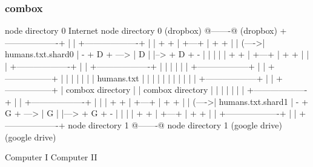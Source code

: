 \begin{frame}[fragile]
  \frametitle{combox}

  {\tiny
  \begin{semiverbatim}

         node directory 0                Internet              node directory 0
         (dropbox)                       @-------@             (dropbox)
        +-------------------+            |       |            +-------------------+
        |                   |    + +     | +---+ |     + +    |                   |
  (---->| humans.txt.shard0 | - + D + ---> | D | |--> + D + - |                   |
  |     |                   |    + +     | +---+ |     + +    |                   |
  |     +-------------------+            |       |            +-------------------+
  |                                      |       |
  |                                      |       |
 +------------------+                    |       |                        +-----------------+
 |                  |                    |       |                        |                 |
 |  humans.txt      |                    |       |                        |                 |
 |                  |                    |       |                        |                 |
 +------------------+                    |       |                        +-----------------+
  |  combox directory                    |       |                      combox directory
  |                                      |       |
  |                                      |       |
  |     +-------------------+            |       |             +-------------------+
  |     |                   |    + +     | +---+ |      + +    |                   |
  (---->| humans.txt.shard1 | - + G + ---> | G | |---> + G + - |                   |
        |                   |    + +     | +---+ |      + +    |                   |
        +-------------------+            |       |             +-------------------+
         node directory 1                @-------@              node directory 1
         (google drive)                                         (google drive)

  Computer I                                                                    Computer II
  \end{semiverbatim}
  }

\end{frame}


